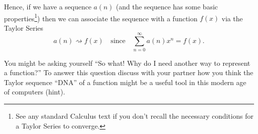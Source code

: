 Hence, if we have a sequence $a(n)$ (and the sequence has some basic
properties\footnote{See any standard Calculus text if you don't recall the necessary
conditions for a Taylor Series to converge.}) then we can associate the sequence with a
function $f(x)$ via the Taylor Series
\[ a(n) \rightsquigarrow f(x) \quad \text{since} \quad \sum_{n=0}^\infty a(n) x^n = f(x). \]

\begin{problem}
    You might be asking yourself ``So what!  Why do I need another way to represent a
    function?''  To answer this question discuss with your partner how you think the
    Taylor sequence ``DNA'' of a function might be a useful tool in this modern age of
    computers (hint).
\end{problem}

